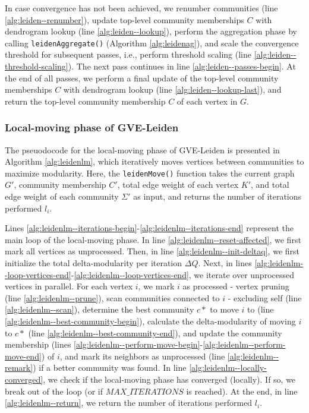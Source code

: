 In case convergence has not been achieved, we renumber communities (line \ref{alg:leiden--renumber}), update top-level community memberships $C$ with dendrogram lookup (line \ref{alg:leiden--lookup}), perform the aggregation phase by calling \texttt{leidenAggregate()} (Algorithm \ref{alg:leidenag}), and scale the convergence threshold for subsequent passes, i.e., perform threshold scaling (line \ref{alg:leiden--threshold-scaling}). The next pass continues in line \ref{alg:leiden--passes-begin}. At the end of all passes, we perform a final update of the top-level community memberships $C$ with dendrogram lookup (line \ref{alg:leiden--lookup-last}), and return the top-level community membership $C$ of each vertex in $G$.








\subsubsection{Local-moving phase of GVE-Leiden}

The pseuodocode for the local-moving phase of GVE-Leiden is presented in Algorithm \ref{alg:leidenlm}, which iteratively moves vertices between communities to maximize modularity. Here, the \texttt{leidenMove()} function takes the current graph $G'$, community membership $C'$, total edge weight of each vertex $K'$, and total edge weight of each community $\Sigma'$ as input, and returns the number of iterations performed $l_i$.

Lines \ref{alg:leidenlm--iterations-begin}-\ref{alg:leidenlm--iterations-end} represent the main loop of the local-moving phase. In line \ref{alg:leidenlm--reset-affected}, we first mark all vertices as unprocessed. Then, in line \ref{alg:leidenlm--init-deltaq}, we first initialize the total delta-modularity per iteration $\Delta Q$. Next, in lines \ref{alg:leidenlm--loop-vertices-end}-\ref{alg:leidenlm--loop-vertices-end}, we iterate over unprocessed vertices in parallel. For each vertex $i$, we mark $i$ as processed - vertex pruning (line \ref{alg:leidenlm--prune}), scan communities connected to $i$ - excluding self (line \ref{alg:leidenlm--scan}), determine the best community $c*$ to move $i$ to (line \ref{alg:leidenlm--best-community-begin}), calculate the delta-modularity of moving $i$ to $c*$ (line \ref{alg:leidenlm--best-community-end}), and update the community membership  (lines \ref{alg:leidenlm--perform-move-begin}-\ref{alg:leidenlm--perform-move-end}) of $i$, and mark its neighbors as unprocessed (line \ref{alg:leidenlm--remark}) if a better community was found. In line \ref{alg:leidenlm--locally-converged}, we check if the local-moving phase has converged (locally). If so, we break out of the loop (or if $MAX\_ITERATIONS$ is reached). At the end, in line \ref{alg:leidenlm--return}, we return the number of iterations performed $l_i$.


